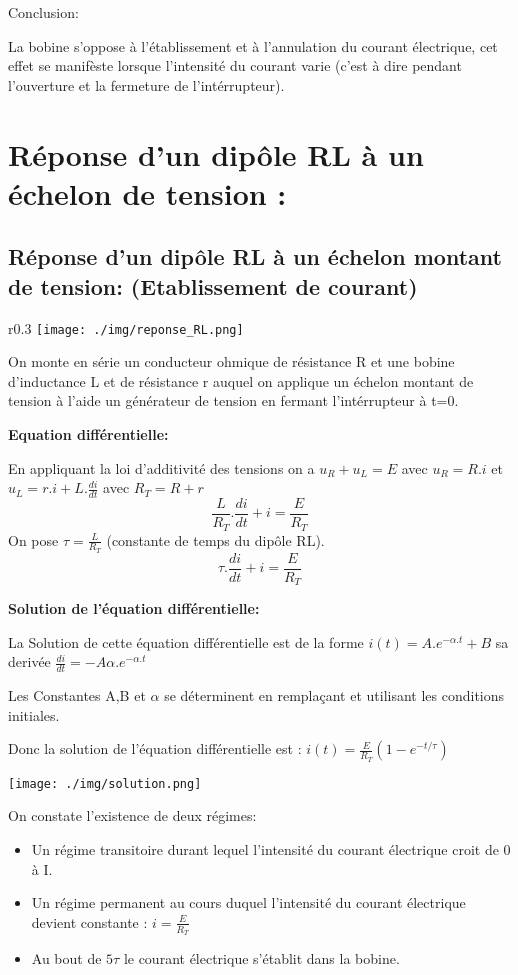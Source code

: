 \documentclass[12pt]{article}
\begin{document}
\begin{tcolorbox}

	Conclusion:

La bobine s'oppose à l'établissement et à l'annulation du courant électrique, cet effet se manifèste lorsque l'intensité
du courant varie (c'est à dire pendant l'ouverture et la fermeture de l'intérrupteur).
\end{tcolorbox}


\section{Réponse d'un dipôle RL à un échelon de tension : }

\subsection{Réponse d'un dipôle RL à un échelon montant de tension:  (Etablissement de courant)}

\begin{wrapfigure}[6]{r}{0.3\textwidth}
	\vspace{-1cm}
	\texttt{[image: ./img/reponse\_RL.png]}
\end{wrapfigure}


On monte en série un conducteur ohmique de résistance R et une bobine d'inductance L et de résistance r
auquel on applique un échelon montant de tension à l'aide un générateur de tension en fermant
l'intérrupteur à t=0.

\textbf{Equation différentielle:}

En appliquant la loi d'additivité des tensions on a $u_R + u_L = E$ avec $u_R = R.i$ et $u_L = r.i + L.\frac{di}{dt}$ avec $R_T = R + r$
$$\frac{L}{R_T}.\frac{di}{dt} + i  = \frac{E}{R_T}$$ On pose $\tau = \frac{L}{R_T}$ (constante de temps du dipôle RL).
$$\tau .\frac{di}{dt} + i  = \frac{E}{R_T}$$


\textbf{Solution de l'équation différentielle:}

La Solution de cette équation différentielle est de la forme $i(t) = A.e^{-\alpha.t} + B$ sa derivée $\frac{di}{dt} = -A\alpha.e^{-\alpha.t}$

Les Constantes A,B et $\alpha$ se déterminent en remplaçant et utilisant les conditions initiales.

Donc la solution de l'équation différentielle est : $i(t) = \frac{E}{R_T}(1-e^{-t/\tau})$

\begin{center}


	\texttt{[image: ./img/solution.png]}
\end{center}
On constate l'existence de deux régimes:
\begin{itemize}
	\item Un régime transitoire durant lequel l'intensité du courant électrique croit de 0 à I.
	\item Un régime permanent au cours duquel l'intensité du courant électrique devient constante : $i = \frac{E}{R_T}$
	\item Au bout de $5\tau$ le courant électrique s'établit dans la bobine. 
\end{itemize}
\end{document}
